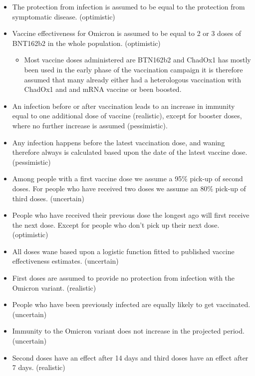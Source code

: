 \documentclass[
]{article}
\providecommand{\tightlist}{%
  \setlength{\itemsep}{0pt}\setlength{\parskip}{0pt}}
\begin{document}
\begin{itemize}
\tightlist
\item
  The protection from infection is assumed to be equal to the protection from symptomatic disease. (optimistic)
\item
  Vaccine effectiveness for Omicron is assumed to be equal to 2 or 3 doses of BNT162b2 in the whole population. (optimistic)

  \begin{itemize}
  \tightlist
  \item
    Most vaccine doses administered are BTN162b2 and ChadOx1 has mostly been used in the early phase of the vaccination campaign
    it is therefore assumed that many already either had a heterologous vaccination with ChadOx1 and and mRNA vaccine or been boosted.
  \end{itemize}
\item
  An infection before or after vaccination leads to an increase in
  immunity equal to one additional dose of vaccine (realistic), except for booster doses, where
  no further increase is assumed (pessimistic).
\item
  Any infection happens before the latest vaccination dose, and
  waning therefore always is calculated based upon the date of the latest vaccine dose. (pessimistic)
\item
  Among people with a first vaccine dose we assume a 95\% pick-up of second doses.
  For people who have received two doses we assume an 80\% pick-up of third doses. (uncertain)
\item
  People who have received their previous dose the longest ago will first receive the next
  dose. Except for people who don't pick up their next dose. (optimistic)
\item
  All doses wane based upon a logistic function fitted to published vaccine effectiveness estimates. (uncertain)
\item
  First doses are assumed to provide no protection from infection with the Omicron variant. (realistic)
\item
  People who have been previously infected are equally likely to get vaccinated. (uncertain)
\item
  Immunity to the Omicron variant does not increase in the projected period. (uncertain)
\item
  Second doses have an effect after 14 days and third doses have an effect after 7 days. (realistic)
\end{itemize}
\end{document}
